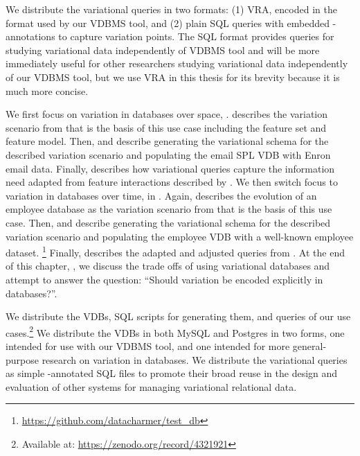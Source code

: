 We distribute the variational queries in two formats: (1) VRA,
encoded in the format used by
our VDBMS tool, and (2) plain SQL queries with embedded 
-annotations to capture variation points.
%
The SQL format provides queries for studying variational data 
independently of VDBMS tool and
will be more immediately useful for other researchers
studying variational data independently of our VDBMS tool, 
but we use VRA in
this thesis for its brevity
because it is much more concise.


We first focus on variation in databases over space, 
.  describes the
variation scenario from \citet{Hall05} that is the basis of this use case including the feature set and
feature model. Then,  and  describe generating the variational schema for the described
variation scenario and populating the email SPL VDB with Enron email data.
Finally,  describes how variational queries capture the information need 
adapted from feature interactions described by \citet{Hall05}.
%
We then switch focus to variation in databases over time,
in . Again,  describes the
evolution of an employee database as the variation scenario from \citet{prima08Moon} 
that is the basis of this use case.
Then,  and  describe generating the variational 
schema for the described
variation scenario and populating the employee VDB with a well-known employee dataset.%
\footnote{\url{https://github.com/datacharmer/test_db}}
Finally,  describes the adapted and adjusted queries from \citet{prima08Moon}. 
%
At the end of this chapter, , we discuss the trade offs of using variational databases and
attempt to answer the question: ``Should variation be encoded explicitly in databases?''.

We distribute the VDBs, SQL scripts for generating them, and queries of our
use cases.\footnote{Available at: \url{https://zenodo.org/record/4321921}}
%
We distribute the VDBs in both MySQL and Postgres in two forms, one intended
for use with our VDBMS tool, and one intended for more general-purpose research
on variation in databases.
%
%
We distribute the variational queries as simple -annotated SQL files
to promote their broad reuse in the design and evaluation of other systems for
managing variational relational data.

%







